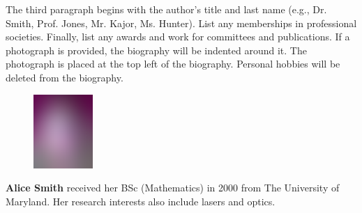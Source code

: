 \documentclass[9pt,twocolumn,twoside]{osajnl}
\begin{document}
The third paragraph begins with the author’s title and last name (e.g., Dr. Smith, Prof. Jones, Mr. Kajor, Ms. Hunter). List any memberships in professional societies. Finally, list any awards and work for committees and publications.  If a photograph is provided, the biography will be indented around it. The photograph is placed at the top left of the biography. Personal hobbies will be deleted from the biography.\\

  \begin{figure}
     \includegraphics[width=0.2\textwidth]{alicesmith}
   \end{figure}
   \noindent
   \textbf{Alice Smith} received her BSc (Mathematics) in 2000 from The University of Maryland. Her research interests also include lasers and optics.\\
  
\end{document}
